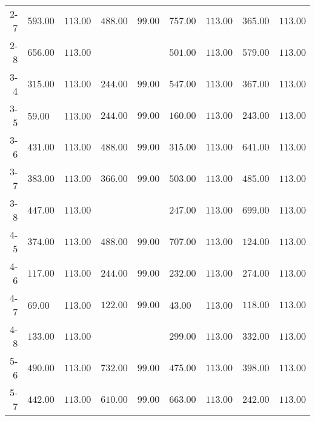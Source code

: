 \begin{table}[ht]
\begin{tabular}{rllllllll}
  2-7 & \(\mathbf{593.00}\) & \(\mathbf{113.00}\) & \(\mathbf{488.00}\) & \(\mathbf{99.00}\) & \(\mathbf{757.00}\) & \(\mathbf{113.00}\) & \(\mathbf{365.00}\) & \(\mathbf{113.00}\) \\ 
  2-8 & \(\mathbf{656.00}\) & \(\mathbf{113.00}\) &  &  & \(\mathbf{501.00}\) & \(\mathbf{113.00}\) & \(\mathbf{579.00}\) & \(\mathbf{113.00}\) \\ 
  3-4 & \(\mathbf{315.00}\) & \(\mathbf{113.00}\) & \(\mathbf{244.00}\) & \(\mathbf{99.00}\) & \(\mathbf{547.00}\) & \(\mathbf{113.00}\) & \(\mathbf{367.00}\) & \(\mathbf{113.00}\) \\ 
  3-5 & 59.00 & 113.00 & \(\mathbf{244.00}\) & \(\mathbf{99.00}\) & \(\mathbf{160.00}\) & \(\mathbf{113.00}\) & \(\mathbf{243.00}\) & \(\mathbf{113.00}\) \\ 
  3-6 & \(\mathbf{431.00}\) & \(\mathbf{113.00}\) & \(\mathbf{488.00}\) & \(\mathbf{99.00}\) & \(\mathbf{315.00}\) & \(\mathbf{113.00}\) & \(\mathbf{641.00}\) & \(\mathbf{113.00}\) \\ 
  3-7 & \(\mathbf{383.00}\) & \(\mathbf{113.00}\) & \(\mathbf{366.00}\) & \(\mathbf{99.00}\) & \(\mathbf{503.00}\) & \(\mathbf{113.00}\) & \(\mathbf{485.00}\) & \(\mathbf{113.00}\) \\ 
  3-8 & \(\mathbf{447.00}\) & \(\mathbf{113.00}\) &  &  & \(\mathbf{247.00}\) & \(\mathbf{113.00}\) & \(\mathbf{699.00}\) & \(\mathbf{113.00}\) \\ 
  4-5 & \(\mathbf{374.00}\) & \(\mathbf{113.00}\) & \(\mathbf{488.00}\) & \(\mathbf{99.00}\) & \(\mathbf{707.00}\) & \(\mathbf{113.00}\) & \(\mathbf{124.00}\) & \(\mathbf{113.00}\) \\ 
  4-6 & \(\mathbf{117.00}\) & \(\mathbf{113.00}\) & \(\mathbf{244.00}\) & \(\mathbf{99.00}\) & \(\mathbf{232.00}\) & \(\mathbf{113.00}\) & \(\mathbf{274.00}\) & \(\mathbf{113.00}\) \\ 
  4-7 & 69.00 & 113.00 & \(\mathbf{122.00}\) & \(\mathbf{99.00}\) & 43.00 & 113.00 & \(\mathbf{118.00}\) & \(\mathbf{113.00}\) \\ 
  4-8 & \(\mathbf{133.00}\) & \(\mathbf{113.00}\) &  &  & \(\mathbf{299.00}\) & \(\mathbf{113.00}\) & \(\mathbf{332.00}\) & \(\mathbf{113.00}\) \\ 
  5-6 & \(\mathbf{490.00}\) & \(\mathbf{113.00}\) & \(\mathbf{732.00}\) & \(\mathbf{99.00}\) & \(\mathbf{475.00}\) & \(\mathbf{113.00}\) & \(\mathbf{398.00}\) & \(\mathbf{113.00}\) \\ 
  5-7 & \(\mathbf{442.00}\) & \(\mathbf{113.00}\) & \(\mathbf{610.00}\) & \(\mathbf{99.00}\) & \(\mathbf{663.00}\) & \(\mathbf{113.00}\) & \(\mathbf{242.00}\) & \(\mathbf{113.00}\) \\ 

\end{tabular}
\end{table}
